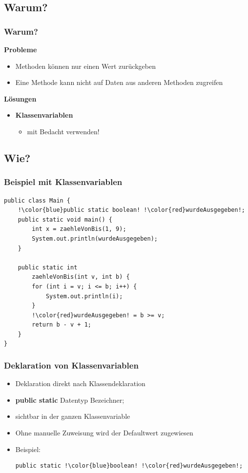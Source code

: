 \documentclass[final]{beamer}
\begin{document}
\subsection{Warum?}
\begin{frame}
	\frametitle{Warum?}
	\textbf{Probleme}
	\begin{itemize}
		\item{Methoden können nur einen Wert zurückgeben}
		\item{Eine Methode kann nicht auf Daten aus anderen Methoden zugreifen}
	\end{itemize}
	\vspace{\baselineskip}
	\pause
	\textbf{Lösungen}
	\pause
	\begin{itemize}
		\item{\textbf{Klassenvariablen}
			\begin{itemize}
				\item{mit Bedacht verwenden!}
			\end{itemize}
		}
	\end{itemize}
\end{frame}
	
\subsection{Wie?}
\begin{frame}[containsverbatim]
	\frametitle{Beispiel mit Klassenvariablen}
	\begin{lstlisting}[escapechar=!]
public class Main {
	!\color{blue}public static boolean! !\color{red}wurdeAusgegeben!;
	public static void main() {
		int x = zaehleVonBis(1, 9);
		System.out.println(wurdeAusgegeben);
	}
	
	public static int 
		zaehleVonBis(int v, int b) {
		for (int i = v; i <= b; i++) {
			System.out.println(i);
		}
		!\color{red}wurdeAusgegeben! = b >= v;
		return b - v + 1;
	}
}
	\end{lstlisting}
\end{frame}

\begin{frame}[containsverbatim]
	\frametitle{Deklaration von Klassenvariablen}
	\begin{itemize}
		\item{Deklaration direkt nach Klassendeklaration}
		\item{\textbf{public static} {\color{blue}Datentyp} {\color{red}Bezeichner};}
		\item{sichtbar in der ganzen Klassenvariable}
		\item{Ohne manuelle Zuweisung wird der Defaultwert zugewiesen}
		\item{Beispiel:
			\begin{lstlisting}[escapechar=!]
public static !\color{blue}boolean! !\color{red}wurdeAusgegeben!;
			\end{lstlisting}
		}
	\end{itemize}
\end{frame}
\end{document}
